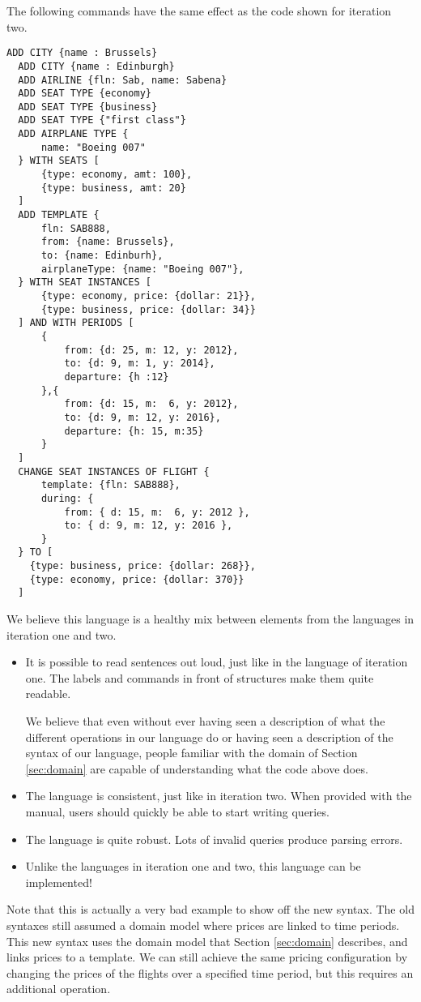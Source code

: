 The following commands have the same effect as the code shown for iteration two.
\begin{lstlisting}[language=airyscript,frame=single]
  ADD CITY {name : Brussels}
  ADD CITY {name : Edinburgh}
  ADD AIRLINE {fln: Sab, name: Sabena}
  ADD SEAT TYPE {economy}
  ADD SEAT TYPE {business}
  ADD SEAT TYPE {"first class"}
  ADD AIRPLANE TYPE {
      name: "Boeing 007"
  } WITH SEATS [
      {type: economy, amt: 100},
      {type: business, amt: 20}
  ]
  ADD TEMPLATE {
      fln: SAB888,
      from: {name: Brussels},
      to: {name: Edinburh},
      airplaneType: {name: "Boeing 007"},
  } WITH SEAT INSTANCES [
      {type: economy, price: {dollar: 21}},
      {type: business, price: {dollar: 34}}
  ] AND WITH PERIODS [
      {
          from: {d: 25, m: 12, y: 2012},
          to: {d: 9, m: 1, y: 2014},
          departure: {h :12}
      },{
          from: {d: 15, m:  6, y: 2012},
          to: {d: 9, m: 12, y: 2016},
          departure: {h: 15, m:35}
      }
  ]
  CHANGE SEAT INSTANCES OF FLIGHT {
      template: {fln: SAB888},
      during: {
          from: { d: 15, m:  6, y: 2012 },
          to: { d: 9, m: 12, y: 2016 },
      }
  } TO [
    {type: business, price: {dollar: 268}},
    {type: economy, price: {dollar: 370}}
  ]
\end{lstlisting}
We believe this language is a healthy mix between elements from the languages in
iteration one and two.
\begin{itemize}
  \item It is possible to read sentences out loud, just like in the language of
    iteration one. The labels and commands in front of structures make them
    quite readable.

    We believe that even without ever having seen a description of what the
    different operations in our language do or having seen a
    description of the syntax of our language, people familiar with the domain
    of Section \ref{sec:domain} are capable of understanding what the code above
    does.
  \item The language is consistent, just like in iteration two. When provided
    with the manual, users should quickly be able to start writing queries.
  \item The language is quite robust. Lots of invalid queries produce parsing
    errors.
  \item Unlike the languages in iteration one and two, this language can be
    implemented!
\end{itemize}
Note that this is actually a very bad example to show off the new syntax.  The
old syntaxes still assumed a domain model where prices are linked to time
periods. This new syntax uses the domain model that Section \ref{sec:domain}
describes, and links prices to a template. We can still achieve the same pricing
configuration by changing the prices of the flights over a specified time
period, but this requires an additional operation.



